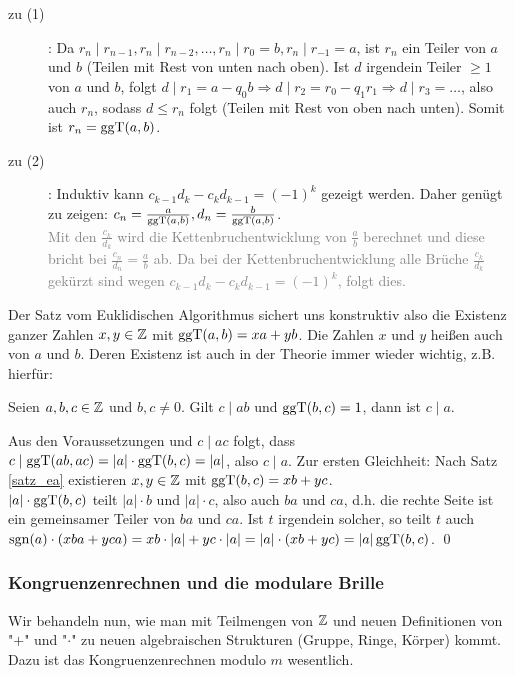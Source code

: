 	\begin{description}
		\item[zu (1)]: Da $r_n \mid r_{n-1}, r_n \mid r_{n-2}, \dots, r_n \mid r_0 = b, r_n \mid r_{-1} = a$, ist $r_n$ ein Teiler von $a$ und $b$ (Teilen mit Rest von unten nach oben). Ist $d$ irgendein Teiler $\geq 1$ von $a$ und $b$, folgt $d \mid r_1 = a -q_0 b \Rightarrow d \mid r_2 = r_0 - q_1 r_1 \Rightarrow d \mid r_3 = \dots$, also auch $r_n$, sodass $d \leq r_n$ folgt (Teilen mit Rest von oben nach unten). Somit ist $r_n = \operatorname{ggT}(a,b)$.
		\item[zu (2)]: Induktiv kann $c_{k-1} d_k - c_k d_{k-1} = (-1)^k$ gezeigt werden. Daher genügt zu zeigen: $c_n = \frac{a}{\operatorname{ggT}(a,b)}, d_n = \frac{b}{\operatorname{ggT}(a,b)}$.  \\
		\textcolor{gray}{Mit den $\frac{c_k}{d_k}$ wird die Kettenbruchentwicklung von $\frac{a}{b}$ berechnet und diese bricht bei $\frac{c_n}{d_n} = \frac{a}{b}$ ab. Da bei der Kettenbruchentwicklung alle Brüche $\frac{c_k}{d_k}$ gekürzt sind wegen $c_{k-1} d_k - c_k d_{k-1} = (-1)^k$, folgt dies.} 
	\end{description}
	
Der Satz vom Euklidischen Algorithmus sichert uns konstruktiv also die Existenz ganzer Zahlen $x,y \in \mathbb{Z}$ mit $\operatorname{ggT}(a,b) = xa + yb$. Die Zahlen $x$ und $y$ heißen auch  von $a$ und $b$. Deren Existenz ist auch in der Theorie immer wieder wichtig, z.B. hierfür:

\begin{lemma}
\label{lemma_21}
	Seien $a,b,c \in \mathbb{Z}$ und $b,c \neq 0$. Gilt $c \mid ab$ und $\operatorname{ggT}(b,c) = 1$, dann ist $c \mid a$.
\end{lemma}

	Aus den Voraussetzungen und $c \mid ac$ folgt, dass $c \mid \operatorname{ggT}(ab,ac) = |a| \cdot \operatorname{ggT}(b,c) = |a|$, also $c \mid a$. Zur ersten Gleichheit: Nach Satz \ref{satz_ea} existieren $x,y \in \mathbb{Z}$ mit $\operatorname{ggT}(b,c) = xb + yc$. \\
	$|a| \cdot \operatorname{ggT}(b,c)$ teilt $|a|\cdot b$ und $|a| \cdot c$, also auch $ba$ und $ca$, d.h. die rechte Seite ist ein gemeinsamer Teiler von $ba$ und $ca$. Ist $t$ irgendein solcher, so teilt $t$ auch $\operatorname{sgn}(a) \cdot(xba + yca) = xb \cdot |a| + yc \cdot |a| = |a| \cdot (xb + yc) = |a| \operatorname{ggT}(b,c)$. \qed
	
\subsubsection{Kongruenzenrechnen und die modulare Brille}
	Wir behandeln nun, wie man mit Teilmengen von $\mathbb{Z}$ und neuen Definitionen von "$+$" und "$\cdot$" zu neuen algebraischen Strukturen (Gruppe, Ringe, Körper) kommt. Dazu ist das Kongruenzenrechnen modulo $m$ wesentlich.
	
